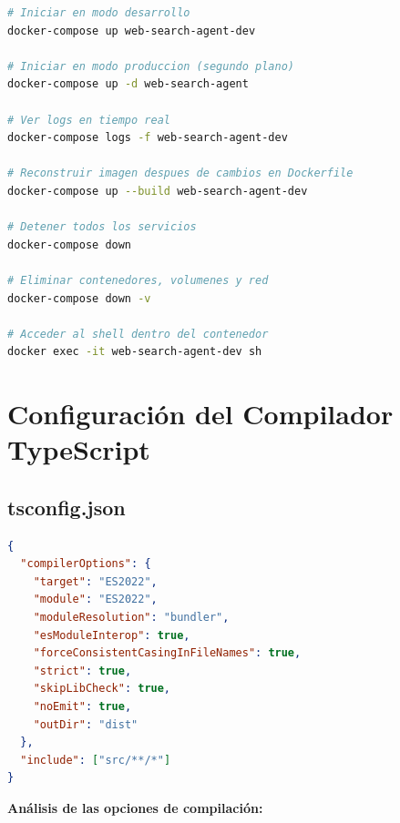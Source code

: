 \documentclass[12pt,a4paper]{article}
\begin{document}
\begin{lstlisting}[language=bash, caption=Comandos Docker - Guía de Uso]
# Iniciar en modo desarrollo
docker-compose up web-search-agent-dev

# Iniciar en modo produccion (segundo plano)
docker-compose up -d web-search-agent

# Ver logs en tiempo real
docker-compose logs -f web-search-agent-dev

# Reconstruir imagen despues de cambios en Dockerfile
docker-compose up --build web-search-agent-dev

# Detener todos los servicios
docker-compose down

# Eliminar contenedores, volumenes y red
docker-compose down -v

# Acceder al shell dentro del contenedor
docker exec -it web-search-agent-dev sh
\end{lstlisting}

\newpage

\section{Configuración del Compilador TypeScript}

\subsection{tsconfig.json}

\begin{lstlisting}[language=JSON, caption=tsconfig.json - Configuración del Compilador]
{
  "compilerOptions": {
    "target": "ES2022",
    "module": "ES2022",
    "moduleResolution": "bundler",
    "esModuleInterop": true,
    "forceConsistentCasingInFileNames": true,
    "strict": true,
    "skipLibCheck": true,
    "noEmit": true,
    "outDir": "dist"
  },
  "include": ["src/**/*"]
}
\end{lstlisting}

\textbf{Análisis de las opciones de compilación:}
\end{document}
